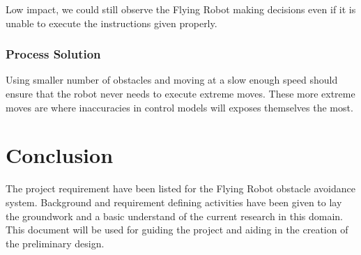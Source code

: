 \documentclass{article}
\begin{document}
		Low impact, we could still observe the Flying Robot making decisions even if it is unable to execute the instructions given properly.
		
		\subsubsection{Process Solution}
		
		Using smaller number of obstacles and moving at a slow enough speed should ensure that the robot never needs to execute extreme moves. These more extreme moves are where inaccuracies in control models will exposes themselves the most. 

\section{Conclusion}

The project requirement have been listed for the Flying Robot obstacle avoidance system. Background and requirement defining activities have been given to lay the groundwork and a basic understand of the current research in this domain. This document will be used for guiding the project and aiding in the creation of the preliminary design. 


\printbibliography

\end{document}
